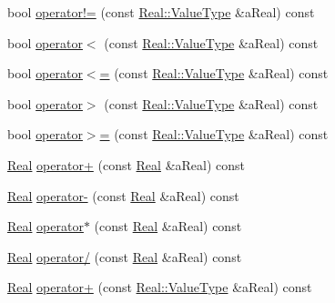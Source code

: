 \begin{DoxyCompactItemize}
bool \hyperlink{classostk_1_1core_1_1types_1_1_real_a5c372f76777883ea02b0e23bed3938e0}{operator!=} (const \hyperlink{classostk_1_1core_1_1types_1_1_real_aa26f796c30b514c98d573f82e3b02296}{Real\+::\+Value\+Type} \&a\+Real) const
\item 
bool \hyperlink{classostk_1_1core_1_1types_1_1_real_aeac3bfa73156aa562496343dd5006500}{operator$<$} (const \hyperlink{classostk_1_1core_1_1types_1_1_real_aa26f796c30b514c98d573f82e3b02296}{Real\+::\+Value\+Type} \&a\+Real) const
\item 
bool \hyperlink{classostk_1_1core_1_1types_1_1_real_aeff2c70386289260a6b756edd7ccb4ed}{operator$<$=} (const \hyperlink{classostk_1_1core_1_1types_1_1_real_aa26f796c30b514c98d573f82e3b02296}{Real\+::\+Value\+Type} \&a\+Real) const
\item 
bool \hyperlink{classostk_1_1core_1_1types_1_1_real_a65763adc12c4edf9fce0d608f1df53b0}{operator$>$} (const \hyperlink{classostk_1_1core_1_1types_1_1_real_aa26f796c30b514c98d573f82e3b02296}{Real\+::\+Value\+Type} \&a\+Real) const
\item 
bool \hyperlink{classostk_1_1core_1_1types_1_1_real_a27a569f5d4a0dd5a50b826432cfa73cc}{operator$>$=} (const \hyperlink{classostk_1_1core_1_1types_1_1_real_aa26f796c30b514c98d573f82e3b02296}{Real\+::\+Value\+Type} \&a\+Real) const
\item 
\hyperlink{classostk_1_1core_1_1types_1_1_real}{Real} \hyperlink{classostk_1_1core_1_1types_1_1_real_af348138d5573a17ae926951dde891902}{operator+} (const \hyperlink{classostk_1_1core_1_1types_1_1_real}{Real} \&a\+Real) const
\item 
\hyperlink{classostk_1_1core_1_1types_1_1_real}{Real} \hyperlink{classostk_1_1core_1_1types_1_1_real_a35bdaf3d85b9584953efe51cdc83200b}{operator-\/} (const \hyperlink{classostk_1_1core_1_1types_1_1_real}{Real} \&a\+Real) const
\item 
\hyperlink{classostk_1_1core_1_1types_1_1_real}{Real} \hyperlink{classostk_1_1core_1_1types_1_1_real_a6de42bb8755a4873cd74bec9943091ee}{operator$\ast$} (const \hyperlink{classostk_1_1core_1_1types_1_1_real}{Real} \&a\+Real) const
\item 
\hyperlink{classostk_1_1core_1_1types_1_1_real}{Real} \hyperlink{classostk_1_1core_1_1types_1_1_real_a4a2298c3fe615be53a42195304f0c9fd}{operator/} (const \hyperlink{classostk_1_1core_1_1types_1_1_real}{Real} \&a\+Real) const
\item 
\hyperlink{classostk_1_1core_1_1types_1_1_real}{Real} \hyperlink{classostk_1_1core_1_1types_1_1_real_ad6ff809c1e808f2fb01ffb92cb6f523e}{operator+} (const \hyperlink{classostk_1_1core_1_1types_1_1_real_aa26f796c30b514c98d573f82e3b02296}{Real\+::\+Value\+Type} \&a\+Real) const

\end{DoxyCompactItemize}
